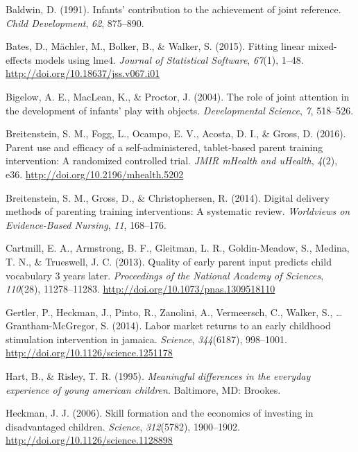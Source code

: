 \documentclass[man,floatsintext]{apa6}
\begin{document}
\begingroup
\setlength{\parindent}{-0.5in}
\setlength{\leftskip}{0.5in}

\hypertarget{refs}{}
\leavevmode\hypertarget{ref-Baldwin1991}{}%
Baldwin, D. (1991). Infants' contribution to the achievement of joint reference. \emph{Child Development}, \emph{62}, 875--890.

\leavevmode\hypertarget{ref-lme4}{}%
Bates, D., Mächler, M., Bolker, B., \& Walker, S. (2015). Fitting linear mixed-effects models using lme4. \emph{Journal of Statistical Software}, \emph{67}(1), 1--48. \url{http://doi.org/10.18637/jss.v067.i01}

\leavevmode\hypertarget{ref-Bigelow2004}{}%
Bigelow, A. E., MacLean, K., \& Proctor, J. (2004). The role of joint attention in the development of infants' play with objects. \emph{Developmental Science}, \emph{7}, 518--526.

\leavevmode\hypertarget{ref-Breitenstein2016}{}%
Breitenstein, S. M., Fogg, L., Ocampo, E. V., Acosta, D. I., \& Gross, D. (2016). Parent use and efficacy of a self-administered, tablet-based parent training intervention: A randomized controlled trial. \emph{JMIR mHealth and uHealth}, \emph{4}(2), e36. \url{http://doi.org/10.2196/mhealth.5202}

\leavevmode\hypertarget{ref-Breitenstein2014}{}%
Breitenstein, S. M., Gross, D., \& Christophersen, R. (2014). Digital delivery methods of parenting training interventions: A systematic review. \emph{Worldviews on Evidence-Based Nursing}, \emph{11}, 168--176.

\leavevmode\hypertarget{ref-Cartmill2013}{}%
Cartmill, E. A., Armstrong, B. F., Gleitman, L. R., Goldin-Meadow, S., Medina, T. N., \& Trueswell, J. C. (2013). Quality of early parent input predicts child vocabulary 3 years later. \emph{Proceedings of the National Academy of Sciences}, \emph{110}(28), 11278--11283. \url{http://doi.org/10.1073/pnas.1309518110}

\leavevmode\hypertarget{ref-Jamaica2014}{}%
Gertler, P., Heckman, J., Pinto, R., Zanolini, A., Vermeersch, C., Walker, S., \ldots{} Grantham-McGregor, S. (2014). Labor market returns to an early childhood stimulation intervention in jamaica. \emph{Science}, \emph{344}(6187), 998--1001. \url{http://doi.org/10.1126/science.1251178}

\leavevmode\hypertarget{ref-Hart1995}{}%
Hart, B., \& Risley, T. R. (1995). \emph{Meaningful differences in the everyday experience of young american children}. Baltimore, MD: Brookes.

\leavevmode\hypertarget{ref-Heckman2006}{}%
Heckman, J. J. (2006). Skill formation and the economics of investing in disadvantaged children. \emph{Science}, \emph{312}(5782), 1900--1902. \url{http://doi.org/10.1126/science.1128898}
\end{document}
